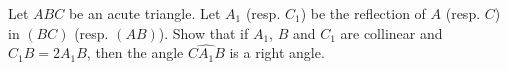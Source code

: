 Let $ABC$ be an acute triangle. Let $A_1$ (resp. $C_1$) be the reflection of $A$ (resp. $C$) in $(BC)$ (resp. $(AB)$). Show that if $A_1$, $B$ and $C_1$ are collinear and $C_1B = 2A_1B$, then the angle $\widehat{CA_1B}$ is a right angle.
